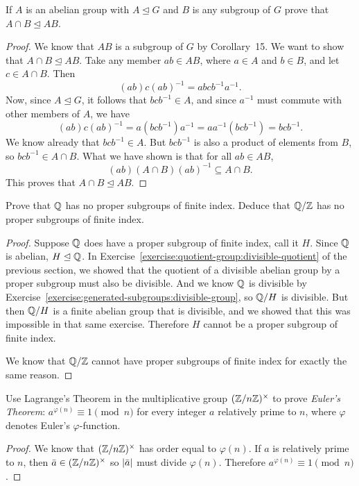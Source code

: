  If $A$ is an abelian group with $A\trianglelefteq G$ and
$B$ is any subgroup of $G$ prove that $A\cap B\trianglelefteq AB$.
\begin{proof}
  We know that $AB$ is a subgroup of $G$ by Corollary~15. We want to
  show that $A\cap B\trianglelefteq AB$. Take any member $ab\in AB$,
  where $a\in A$ and $b\in B$, and let $c\in A\cap B$. Then
  \begin{equation*}
    (ab)c(ab)^{-1} = abcb^{-1}a^{-1}.
  \end{equation*}
  Now, since $A\trianglelefteq G$, it follows that $bcb^{-1}\in A$,
  and since $a^{-1}$ must commute with other members of $A$, we have
  \begin{equation*}
    (ab)c(ab)^{-1} = a(bcb^{-1})a^{-1} = aa^{-1}(bcb^{-1}) = bcb^{-1}.
  \end{equation*}
  We know already that $bcb^{-1}\in A$. But $bcb^{-1}$ is also a
  product of elements from $B$, so $bcb^{-1}\in A\cap B$. What we have
  shown is that for all $ab\in AB$,
  \begin{equation*}
    (ab)(A\cap B)(ab)^{-1}\subseteq A\cap B.
  \end{equation*}
  This proves that $A\cap B\trianglelefteq AB$.
\end{proof}

 Prove that $\mathbb{Q}$ has no proper subgroups of finite
index. Deduce that $\mathbb{Q}/\mathbb{Z}$ has no proper subgroups of finite index.
\begin{proof}
  Suppose $\mathbb{Q}$ does have a proper subgroup of finite index, call it
  $H$. Since $\mathbb{Q}$ is abelian, $H\trianglelefteq\mathbb{Q}$. In
  Exercise~\ref{exercise:quotient-group:divisible-quotient} of the
  previous section, we showed that the quotient of a divisible abelian
  group by a proper subgroup must also be divisible. And we know $\mathbb{Q}$
  is divisible by
  Exercise~\ref{exercise:generated-subgroups:divisible-group}, so
  $\mathbb{Q}/H$ is divisible. But then $\mathbb{Q}/H$ is a finite abelian group that
  is divisible, and we showed that this was impossible in that same
  exercise. Therefore $H$ cannot be a proper subgroup of finite index.

  We know that $\mathbb{Q}/\mathbb{Z}$ cannot have proper subgroups of finite index
  for exactly the same reason.
\end{proof}

 Use Lagrange's Theorem in the multiplicative group
$(\mathbb{Z}/n\mathbb{Z})^\times$ to prove {\em Euler's Theorem}:
$a^{\varphi(n)}\equiv1\pmod{n}$ for every integer $a$ relatively prime
to $n$, where $\varphi$ denotes Euler's $\varphi$-function.
\begin{proof}
  We know that $(\mathbb{Z}/n\mathbb{Z})^\times$ has order equal to $\varphi(n)$. If
  $a$ is relatively prime to $n$, then $\bar{a}\in(\mathbb{Z}/n\mathbb{Z})^\times$ so
  $\lvert{\bar{a}}\rvert$ must divide $\varphi(n)$. Therefore
  $a^{\varphi(n)}\equiv1\pmod{n}$.
\end{proof}

